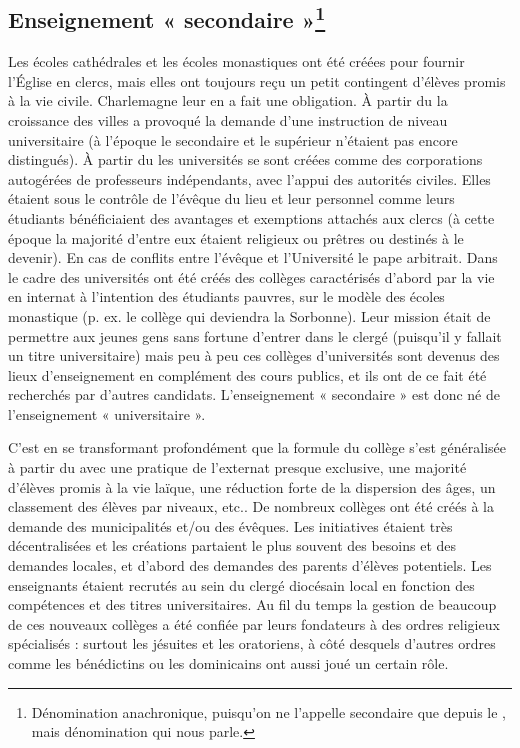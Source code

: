 \subsection[Enseignement « secondaire »]{Enseignement « secondaire »\footnote{Dénomination anachronique, puisqu'on ne l'appelle secondaire que depuis le , mais dénomination qui nous parle.}}

Les écoles cathédrales et les écoles monastiques ont été créées pour fournir l'Église en clercs, mais elles ont toujours reçu un petit contingent d'élèves promis à la vie civile. Charlemagne leur en a fait une obligation. À partir du  la croissance des villes a provoqué la demande d'une instruction de niveau universitaire (à l'époque le secondaire et le supérieur n'étaient pas encore distingués). À partir du  les universités se sont créées comme des corporations autogérées de professeurs indépendants, avec l'appui des autorités civiles. Elles étaient sous le contrôle de l'évêque du lieu et leur personnel comme leurs étudiants bénéficiaient des avantages et exemptions attachés aux clercs (à cette époque la majorité d'entre eux étaient religieux ou prêtres ou destinés à le devenir). En cas de conflits entre l'évêque et l'Université le pape arbitrait. Dans le cadre des universités ont été créés des collèges caractérisés d'abord par la vie en internat à l'intention des étudiants pauvres, sur le modèle des écoles monastique (p. ex. le collège qui deviendra la Sorbonne). Leur mission était de permettre aux jeunes gens sans fortune d'entrer dans le clergé (puisqu'il y fallait un titre universitaire) mais peu à peu ces collèges d'universités sont devenus des lieux d'enseignement en complément des cours publics, et ils ont de ce fait été recherchés par d'autres candidats. L'enseignement « secondaire » est donc né de l'enseignement « universitaire ».

C'est en se transformant profondément que la formule du collège s'est généralisée à partir du   avec une pratique de l'externat presque exclusive, une majorité d'élèves promis à la vie laïque, une réduction forte de la dispersion des âges, un classement des élèves par niveaux, etc.. De nombreux collèges ont été créés à la demande des municipalités et/ou des évêques. Les initiatives étaient très décentralisées et les créations partaient le plus souvent des besoins et des demandes locales, et d'abord des demandes des parents d'élèves potentiels. Les enseignants étaient recrutés au sein du clergé diocésain local en fonction des compétences et des titres universitaires. Au fil du temps la gestion de beaucoup de ces nouveaux collèges a été confiée par leurs fondateurs à des ordres religieux spécialisés : surtout les jésuites et les oratoriens, à côté desquels d'autres ordres comme les bénédictins ou les dominicains ont aussi joué un certain rôle. 

